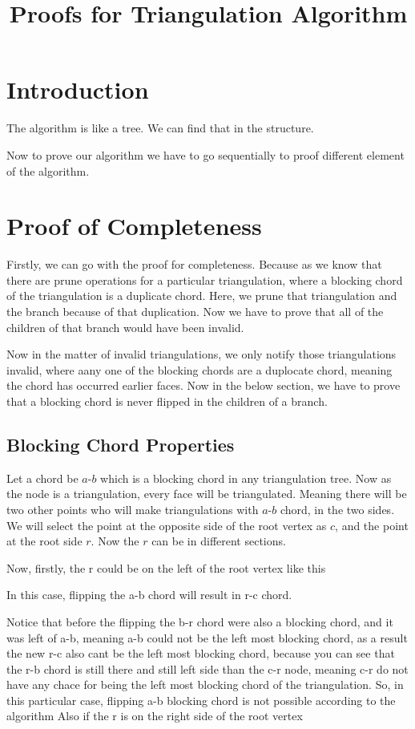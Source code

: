 \documentclass[12pt,a4paper]{article}
\title{Proofs for Triangulation Algorithm}
\author{}
\date{}
\begin{document}
\maketitle

\section{Introduction}

The algorithm is like a tree. We can find that in the structure.

Now to prove our algorithm we have to go sequentially to proof different element of the algorithm.

\section{Proof of Completeness}

Firstly, we can go with the proof for completeness. Because as we know that there are prune operations for a particular triangulation, where a blocking chord of the triangulation is a duplicate chord. Here, we prune that triangulation and the branch because of that duplication. Now we have to prove that all of the children of that branch would have been invalid.

Now in the matter of invalid triangulations, we only notify those triangulations invalid, where aany one of the blocking chords are a duplocate chord, meaning the chord has occurred earlier faces. Now in the below section, we have to prove that a blocking chord is never flipped in the children of a branch.

\subsection{Blocking Chord Properties}

Let a chord be $a$-$b$ which is a blocking chord in any triangulation tree. Now as the node is a triangulation, every face will be triangulated. Meaning there will be two other points who will make triangulations with $a$-$b$ chord, in the two sides. We will select the point at the opposite side of the root vertex as $c$, and the point at the root side $r$. Now the $r$ can be in different sections.

Now, firstly, the r could be on the left of the root vertex like this 

In this case, flipping the a-b chord will result in r-c chord.

Notice that before the flipping the b-r chord were also a blocking chord, and it was left of a-b, meaning a-b could not be the left most blocking chord, as a result the new r-c also cant be the left most blocking chord, because you can see that the r-b chord is still there and still left side than the c-r node, meaning c-r do not have any chace for being the left most blocking chord of the triangulation. So, in this particular case, flipping a-b blocking chord is not possible according to the algorithm
Also if the r is on the right side of the root vertex 
\end{document}
